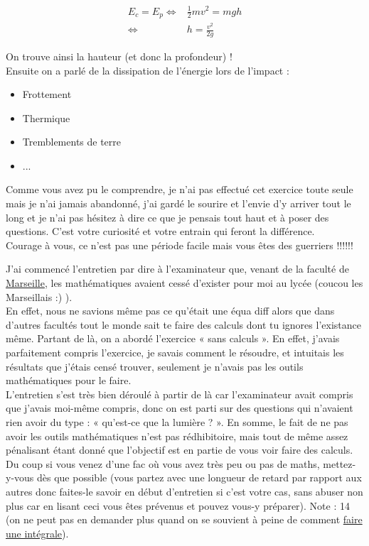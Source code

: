 $$
\begin{aligned}
    E_c=E_p
    \iff &\frac12mv^2=mgh\\
    \iff &h=\frac{v^2}{2g}
\end{aligned}
$$

On trouve ainsi la hauteur (et donc la profondeur) !\\

Ensuite on a parlé de la dissipation de l’énergie lors de l’impact :
\begin{itemize}
    \item Frottement
    \item Thermique
    \item Tremblements de terre
    \item ...
\end{itemize}

Comme vous avez pu le comprendre, je n’ai pas effectué cet exercice toute seule mais je n’ai jamais abandonné, j’ai gardé le sourire et l’envie d’y arriver tout le long et je n’ai pas hésitez à dire ce que je pensais tout haut et à poser des questions. C’est votre curiosité et votre entrain qui feront la différence.\\

Courage à vous, ce n’est pas une période facile mais vous êtes des guerriers !!!!!!

\newpage

\lettrine{{\color{yellow!80!black} \oldpilcrowfive}}{}
J’ai commencé l’entretien par dire à l’examinateur que, venant de la faculté de \href{https://www.youtube.com/watch?v=LkUfrAJbLus}{Marseille}, les mathématiques avaient cessé d’exister pour moi au lycée (coucou les Marseillais :) ).\\
En effet, nous ne savions même pas ce qu’était une équa diff alors que dans d’autres facultés tout le monde sait te faire des calculs dont tu ignores l’existance même. Partant de là, on a abordé l’exercice « sans calculs ». En effet, j’avais parfaitement compris l’exercice, je savais comment le résoudre, et intuitais les résultats que j’étais censé trouver, seulement je n’avais pas les outils mathématiques pour le faire. \\
L’entretien s’est très bien déroulé à partir de là car l’examinateur avait compris que j’avais moi-même compris, donc on est parti sur des questions qui n’avaient rien avoir du type : « qu’est-ce que la lumière ? ». En somme, le fait de ne pas avoir les outils mathématiques n’est pas rédhibitoire, mais tout de même assez pénalisant étant donné que l’objectif est en partie de vous voir faire des calculs. Du coup si vous venez d’une fac où vous avez très peu ou pas de maths, mettez-y-vous dès que possible (vous partez avec une longueur de retard par rapport aux autres donc faites-le savoir en début d’entretien si c’est votre cas, sans abuser non plus car en lisant ceci vous êtes prévenus et pouvez vous-y préparer). Note : 14 (on ne peut pas en demander plus quand on se souvient à peine de comment \href{https://www.youtube.com/watch?v=Z3vKJJE57Uw}{faire une intégrale}).\\


